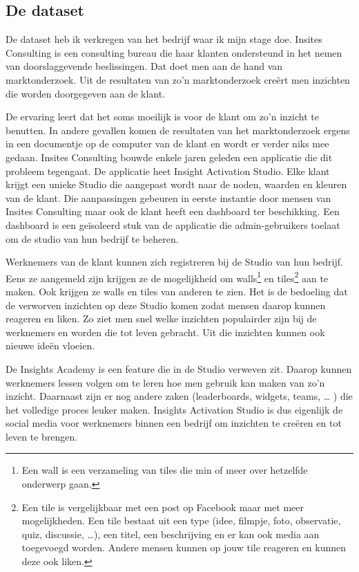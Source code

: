 \subsection{De dataset}
De dataset heb ik verkregen van het bedrijf waar ik mijn stage doe. Insites Consulting is een consulting bureau die haar klanten ondersteund in het nemen van doorslaggevende beslissingen. Dat doet men aan de hand van marktonderzoek. Uit de resultaten van zo'n marktonderzoek creërt men inzichten die worden doorgegeven aan de klant. 

De ervaring leert dat het soms moeilijk is voor de klant om zo'n inzicht te benutten. In andere gevallen komen de resultaten van het marktonderzoek ergens in een documentje op de computer van de klant en wordt er verder niks mee gedaan. Insites Consulting bouwde enkele jaren geleden een applicatie die dit probleem tegengaat. De applicatie heet Insight Activation Studio. Elke klant krijgt een unieke Studio die aangepast wordt naar de noden, waarden en kleuren van de klant. Die aanpassingen gebeuren in eerste instantie door mensen van Insites Consulting maar ook de klant heeft een dashboard ter beschikking. Een dashboard is een geïsoleerd stuk van de applicatie die admin-gebruikers toelaat om de studio van hun bedrijf te beheren.  

Werknemers van de klant kunnen zich registreren bij de Studio van hun bedrijf. Eens ze aangemeld zijn krijgen ze de mogelijkheid om walls\footnote{Een wall is een verzameling van tiles die min of meer over hetzelfde onderwerp gaan.} en tiles\footnote{Een tile is vergelijkbaar met een post op Facebook maar met meer mogelijkheden. Een tile bestaat uit een type (idee, filmpje, foto, observatie, quiz, discussie, …), een titel, een beschrijving en er kan ook media aan toegevoegd worden. Andere mensen kunnen op jouw tile reageren en kunnen deze ook liken.} aan te maken. Ook krijgen ze walls en tiles van anderen te zien. Het is de bedoeling dat de verworven inzichten op deze Studio komen zodat mensen daarop kunnen reageren en liken. Zo ziet men snel welke inzichten populairder zijn bij de werknemers en worden die tot leven gebracht. Uit die inzichten kunnen ook nieuwe ideën vloeien.

De Insights Academy is een feature die in de Studio verweven zit. Daarop kunnen werknemers lessen volgen om te leren hoe men gebruik kan maken van zo’n inzicht. Daarnaast zijn er nog andere zaken (leaderboards, widgets, teams, … ) die het volledige proces leuker maken. Insights Activation Studio is dus eigenlijk de social media voor werknemers binnen een bedrijf om inzichten te creëren en tot leven te brengen.

